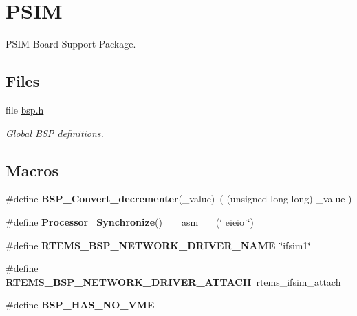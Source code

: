 \hypertarget{group__RTEMSBSPsPowerPCPSIM}{}\section{P\+S\+IM}
\label{group__RTEMSBSPsPowerPCPSIM}


P\+S\+IM Board Support Package.  


\subsection*{Files}
\begin{DoxyCompactItemize}
\item 
file \mbox{\hyperlink{bsps_2powerpc_2psim_2include_2bsp_8h}{bsp.\+h}}
\begin{DoxyCompactList}\small\item\em Global B\+SP definitions. \end{DoxyCompactList}\end{DoxyCompactItemize}
\subsection*{Macros}
\begin{DoxyCompactItemize}
\item 
\mbox{\label{group__RTEMSBSPsPowerPCPSIM_ga5b3b7a8f2f89a6110c93e0229f67c104}} 
\#define {\bfseries B\+S\+P\+\_\+\+Convert\+\_\+decrementer}(\+\_\+value)~( (unsigned long long) \+\_\+value )
\item 
\mbox{\label{group__RTEMSBSPsPowerPCPSIM_gaa765ee7bed323f8d6254d150cb4a8053}} 
\#define {\bfseries Processor\+\_\+\+Synchronize}()~\mbox{\hyperlink{group__RTEMSScoreCPUSPARC_ga82257d4fc068f4b21b029dd69d276839}{\+\_\+\+\_\+asm\+\_\+\+\_\+}} (\char`\"{} eieio \char`\"{})
\item 
\mbox{\label{group__RTEMSBSPsPowerPCPSIM_ga86d4f9aa98431100692e31068070a8df}} 
\#define {\bfseries R\+T\+E\+M\+S\+\_\+\+B\+S\+P\+\_\+\+N\+E\+T\+W\+O\+R\+K\+\_\+\+D\+R\+I\+V\+E\+R\+\_\+\+N\+A\+ME}~\char`\"{}ifsim1\char`\"{}
\item 
\mbox{\label{group__RTEMSBSPsPowerPCPSIM_gadde0d66aef9442971dde465292ac14e6}} 
\#define {\bfseries R\+T\+E\+M\+S\+\_\+\+B\+S\+P\+\_\+\+N\+E\+T\+W\+O\+R\+K\+\_\+\+D\+R\+I\+V\+E\+R\+\_\+\+A\+T\+T\+A\+CH}~rtems\+\_\+ifsim\+\_\+attach
\item 
\mbox{\label{group__RTEMSBSPsPowerPCPSIM_gaf4f99fc46536f8a1855871b957a8cc50}} 
\#define {\bfseries B\+S\+P\+\_\+\+H\+A\+S\+\_\+\+N\+O\+\_\+\+V\+ME}
\end{DoxyCompactItemize}

